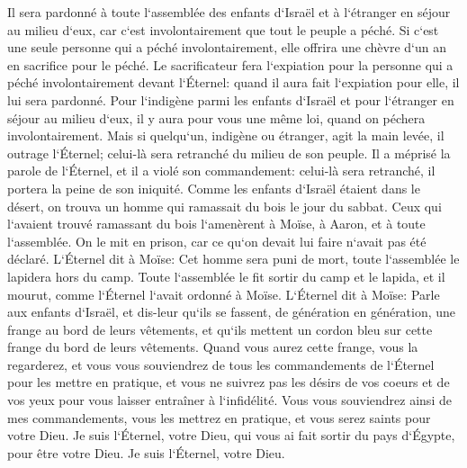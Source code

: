 \verse Il sera pardonné à toute l`assemblée des enfants d`Israël et à l`étranger en séjour au milieu d`eux, car c`est involontairement que tout le peuple a péché. 
\verse Si c`est une seule personne qui a péché involontairement, elle offrira une chèvre d`un an en sacrifice pour le péché. 
\verse Le sacrificateur fera l`expiation pour la personne qui a péché involontairement devant l`Éternel: quand il aura fait l`expiation pour elle, il lui sera pardonné. 
\verse Pour l`indigène parmi les enfants d`Israël et pour l`étranger en séjour au milieu d`eux, il y aura pour vous une même loi, quand on péchera involontairement. 
\verse Mais si quelqu`un, indigène ou étranger, agit la main levée, il outrage l`Éternel; celui-là sera retranché du milieu de son peuple. 
\verse Il a méprisé la parole de l`Éternel, et il a violé son commandement: celui-là sera retranché, il portera la peine de son iniquité. 
\verse Comme les enfants d`Israël étaient dans le désert, on trouva un homme qui ramassait du bois le jour du sabbat. 
\verse Ceux qui l`avaient trouvé ramassant du bois l`amenèrent à Moïse, à Aaron, et à toute l`assemblée. 
\verse On le mit en prison, car ce qu`on devait lui faire n`avait pas été déclaré. 
\verse L`Éternel dit à Moïse: Cet homme sera puni de mort, toute l`assemblée le lapidera hors du camp. 
\verse Toute l`assemblée le fit sortir du camp et le lapida, et il mourut, comme l`Éternel l`avait ordonné à Moïse. 
\verse L`Éternel dit à Moïse: 
\verse Parle aux enfants d`Israël, et dis-leur qu`ils se fassent, de génération en génération, une frange au bord de leurs vêtements, et qu`ils mettent un cordon bleu sur cette frange du bord de leurs vêtements. 
\verse Quand vous aurez cette frange, vous la regarderez, et vous vous souviendrez de tous les commandements de l`Éternel pour les mettre en pratique, et vous ne suivrez pas les désirs de vos coeurs et de vos yeux pour vous laisser entraîner à l`infidélité. 
\verse Vous vous souviendrez ainsi de mes commandements, vous les mettrez en pratique, et vous serez saints pour votre Dieu. 
\verse Je suis l`Éternel, votre Dieu, qui vous ai fait sortir du pays d`Égypte, pour être votre Dieu. Je suis l`Éternel, votre Dieu. 

